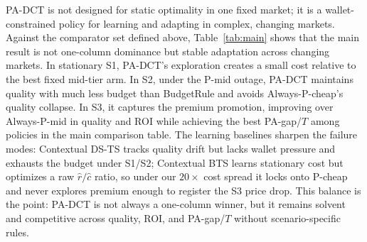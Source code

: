 PA-DCT is not designed for static optimality in one fixed market; it is a wallet-constrained policy for learning and adapting in complex, changing markets. Against the comparator set defined above, Table~\ref{tab:main} shows that the main result is not one-column dominance but stable adaptation across changing markets. In stationary S1, PA-DCT's exploration creates a small cost relative to the best fixed mid-tier arm. In S2, under the P-mid outage, PA-DCT maintains quality with much less budget than BudgetRule and avoids Always-P-cheap's quality collapse. In S3, it captures the premium promotion, improving over Always-P-mid in quality and ROI while achieving the best PA-gap/$T$ among policies in the main comparison table. The learning baselines sharpen the failure modes: Contextual DS-TS tracks quality drift but lacks wallet pressure and exhausts the budget under S1/S2; Contextual BTS learns stationary cost but optimizes a raw $\hat r / \hat c$ ratio, so under our $20\times$ cost spread it locks onto P-cheap and never explores premium enough to register the S3 price drop. This balance is the point: PA-DCT is not always a one-column winner, but it remains solvent and competitive across quality, ROI, and PA-gap/$T$ without scenario-specific rules.

